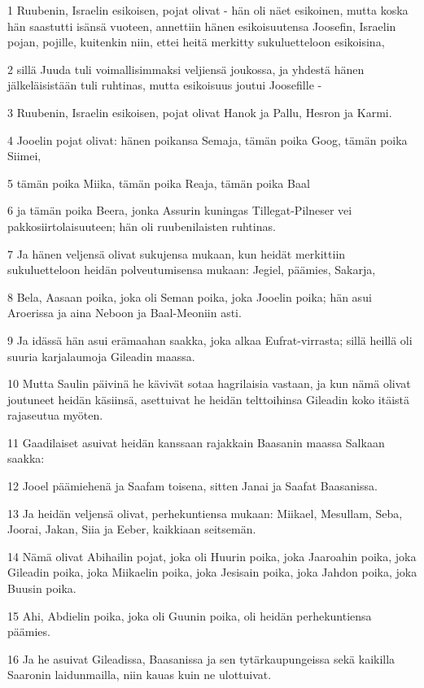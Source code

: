 \par 1 Ruubenin, Israelin esikoisen, pojat olivat - hän oli näet esikoinen, mutta koska hän saastutti isänsä vuoteen, annettiin hänen esikoisuutensa Joosefin, Israelin pojan, pojille, kuitenkin niin, ettei heitä merkitty sukuluetteloon esikoisina,
\par 2 sillä Juuda tuli voimallisimmaksi veljiensä joukossa, ja yhdestä hänen jälkeläisistään tuli ruhtinas, mutta esikoisuus joutui Joosefille -
\par 3 Ruubenin, Israelin esikoisen, pojat olivat Hanok ja Pallu, Hesron ja Karmi.
\par 4 Jooelin pojat olivat: hänen poikansa Semaja, tämän poika Goog, tämän poika Siimei,
\par 5 tämän poika Miika, tämän poika Reaja, tämän poika Baal
\par 6 ja tämän poika Beera, jonka Assurin kuningas Tillegat-Pilneser vei pakkosiirtolaisuuteen; hän oli ruubenilaisten ruhtinas.
\par 7 Ja hänen veljensä olivat sukujensa mukaan, kun heidät merkittiin sukuluetteloon heidän polveutumisensa mukaan: Jegiel, päämies, Sakarja,
\par 8 Bela, Aasaan poika, joka oli Seman poika, joka Jooelin poika; hän asui Aroerissa ja aina Neboon ja Baal-Meoniin asti.
\par 9 Ja idässä hän asui erämaahan saakka, joka alkaa Eufrat-virrasta; sillä heillä oli suuria karjalaumoja Gileadin maassa.
\par 10 Mutta Saulin päivinä he kävivät sotaa hagrilaisia vastaan, ja kun nämä olivat joutuneet heidän käsiinsä, asettuivat he heidän telttoihinsa Gileadin koko itäistä rajaseutua myöten.
\par 11 Gaadilaiset asuivat heidän kanssaan rajakkain Baasanin maassa Salkaan saakka:
\par 12 Jooel päämiehenä ja Saafam toisena, sitten Janai ja Saafat Baasanissa.
\par 13 Ja heidän veljensä olivat, perhekuntiensa mukaan: Miikael, Mesullam, Seba, Joorai, Jakan, Siia ja Eeber, kaikkiaan seitsemän.
\par 14 Nämä olivat Abihailin pojat, joka oli Huurin poika, joka Jaaroahin poika, joka Gileadin poika, joka Miikaelin poika, joka Jesisain poika, joka Jahdon poika, joka Buusin poika.
\par 15 Ahi, Abdielin poika, joka oli Guunin poika, oli heidän perhekuntiensa päämies.
\par 16 Ja he asuivat Gileadissa, Baasanissa ja sen tytärkaupungeissa sekä kaikilla Saaronin laidunmailla, niin kauas kuin ne ulottuivat.
